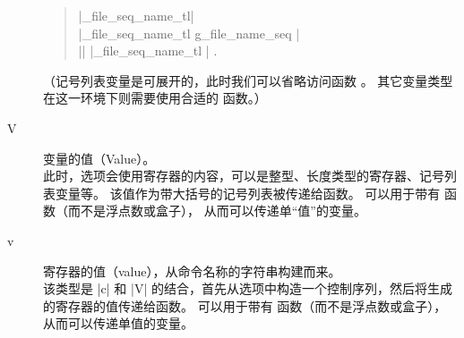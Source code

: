 \documentclass[full]{l3doc}
\begin{document}
\begin{description}
    \begin{quote}
         |\g_file_seq_name_tl| \\
         |\g_file_seq_name_tl { g_file_name_seq }| \\
         |{|  |\g_file_seq_name_tl }| .
    \end{quote}
    （记号列表变量是可展开的，此时我们可以省略访问函数 。
    其它变量类型在这一环境下则需要使用合适的  函数。）
    \item[V] 变量的值（Value）。\\
    此时，选项会使用寄存器的内容，可以是整型、长度类型的寄存器、记号列表变量等。
    该值作为带大括号的记号列表被传递给函数。
    可以用于带有  函数（而不是浮点数或盒子），
    从而可以传递单“值”的变量。
    \item[v] 寄存器的值（value），从命令名称的字符串构建而来。\\
    该类型是 |c| 和 |V| 的结合，首先从选项中构造一个控制序列，然后将生成的寄存器的值传递给函数。
    可以用于带有  函数（而不是浮点数或盒子），
    从而可以传递单值的变量。

\end{description}
\end{document}
